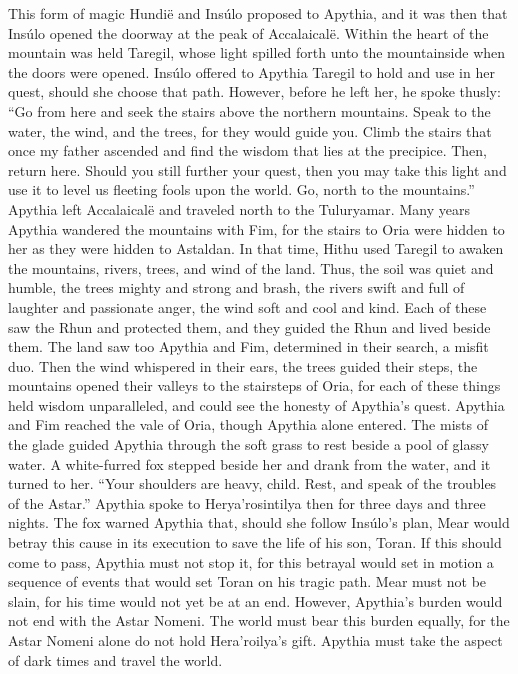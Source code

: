 \documentclass[smalldemyvopaper,11pt,twoside,onecolumn,openright,extrafontsizes]{memoir}
\begin{document}
{{This form of magic Hundië and Insúlo proposed to Apythia, and it was then that Insúlo opened the doorway at the peak of Accalaicalë. Within the heart of the mountain was held Taregil, whose light spilled forth unto the mountainside when the doors were opened. Insúlo offered to Apythia Taregil to hold and use in her quest, should she choose that path. However, before he left her, he spoke thusly:
“Go from here and seek the stairs above the northern mountains. Speak to the water, the wind, and the trees, for they would guide you. Climb the stairs that once my father ascended and find the wisdom that lies at the precipice. Then, return here. Should you still further your quest, then you may take this light and use it to level us fleeting fools upon the world. Go, north to the mountains.”
Apythia left Accalaicalë and traveled north to the Tuluryamar. Many years Apythia wandered the mountains with Fim, for the stairs to Oria were hidden to her as they were hidden to Astaldan. In that time, Hithu used Taregil to awaken the mountains, rivers, trees, and wind of the land. Thus, the soil was quiet and humble, the trees mighty and strong and brash, the rivers swift and full of laughter and passionate anger, the wind soft and cool and kind. Each of these saw the Rhun and protected them, and they guided the Rhun and lived beside them. The land saw too Apythia and Fim, determined in their search, a misfit duo. Then the wind whispered in their ears, the trees guided their steps, the mountains opened their valleys to the stairsteps of Oria, for each of these things held wisdom unparalleled, and could see the honesty of Apythia’s quest.
Apythia and Fim reached the vale of Oria, though Apythia alone entered. The mists of the glade guided Apythia through the soft grass to rest beside a pool of glassy water. A white-furred fox stepped beside her and drank from the water, and it turned to her.
“Your shoulders are heavy, child. Rest, and speak of the troubles of the Astar.” Apythia spoke to Herya’rosintilya then for three days and three nights. The fox warned Apythia that, should she follow Insúlo’s plan, Mear would betray this cause in its execution to save the life of his son, Toran. If this should come to pass, Apythia must not stop it, for this betrayal would set in motion a sequence of events that would set Toran on his tragic path. Mear must not be slain, for his time would not yet be at an end. However, Apythia’s burden would not end with the Astar Nomeni. The world must bear this burden equally, for the Astar Nomeni alone do not hold Hera’roilya’s gift. Apythia must take the aspect of dark times and travel the world.
}}
\end{document}
